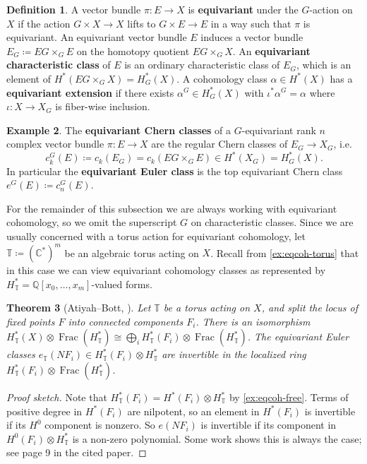 \documentclass{report}
\theoremstyle{plain}
\newtheorem{theorem}{Theorem}[section]
\theoremstyle{definition}
\newtheorem{definition}[theorem]{Definition}
\newtheorem{example}[theorem]{Example}
\theoremstyle{remark}
\newcommand{\bC}{\mathbb{C}}
\newcommand{\bT}{\mathbb{T}}
\newcommand{\bQ}{\mathbb{Q}}
\DeclareMathOperator{\Frac}{Frac}
\begin{document}
\begin{definition} \label{def:equivariant-characteristic-classes}
  A vector bundle $\pi\colon E \to X$ is {\bf equivariant} under the
  $G$-action on $X$ if the action $G \times X \to X$ lifts to $G
  \times E \to E$ in a way such that $\pi$ is equivariant. An
  equivariant vector bundle $E$ induces a vector bundle $E_G \coloneqq
  EG \times_G E$ on the homotopy quotient $EG \times_G X$. An {\bf
    equivariant characteristic class} of $E$ is an ordinary
  characteristic class of $E_G$, which is an element of $H^*(EG
  \times_G X) = H^*_G(X)$. A cohomology class $\alpha \in H^*(X)$ has
  a {\bf equivariant extension} if there exists $\alpha^G \in
  H^*_G(X)$ with $\iota^*\alpha^G = \alpha$ where $\iota\colon X \to
  X_G$ is fiber-wise inclusion.
\end{definition}

\begin{example}
  The {\bf equivariant Chern classes} of a $G$-equivariant rank $n$
  complex vector bundle $\pi\colon E \to X$ are the regular Chern
  classes of $E_G \to X_G$, i.e.
  \[ c_k^G(E) \coloneqq c_k(E_G) = c_k(EG \times_G E) \in H^*(X_G) = H^*_G(X). \]
  In particular the {\bf equivariant Euler class} is the top
  equivariant Chern class $e^G(E) \coloneqq c_n^G(E)$.
\end{example}

For the remainder of this subsection we are always working with
equivariant cohomology, so we omit the superscript $G$ on
characteristic classes. Since we are usually concerned with a torus
action for equivariant cohomology, let $\bT \coloneqq (\bC^*)^m$ be an
algebraic torus acting on $X$. Recall from \ref{ex:eqcoh-torus} that
in this case we can view equivariant cohomology classes as represented
by $H^*_{\bT} = \bQ[x_0, \ldots, x_m]$-valued forms.

\begin{theorem}[Atiyah--Bott, \cite{Atiyah1984}] \label{thm:atiyah-bott-localization}
  Let $\bT$ be a torus acting on $X$, and split the locus of fixed
  points $F$ into connected components $F_i$. There is an isomorphism
  $H^*_{\bT}(X) \otimes \Frac(H^*_{\bT}) \cong \bigoplus_i
  H^*_{\bT}(F_i) \otimes \Frac(H^*_{\bT})$. The equivariant Euler
  classes $e_{\bT}(NF_i) \in H^*_{\bT}(F_i) \otimes H^*_{\bT}$ are
  invertible in the localized ring $H^*_{\bT}(F_i) \otimes
  \Frac(H^*_{\bT})$.
\end{theorem}

\begin{proof}[Proof sketch]
  Note that $H^*_{\bT}(F_i) = H^*(F_i) \otimes H^*_{\bT}$ by
  \ref{ex:eqcoh-free}. Terms of positive degree in $H^*(F_i)$ are
  nilpotent, so an element in $H^*(F_i)$ is invertible if its $H^0$
  component is nonzero. So $e(NF_i)$ is invertible if its component in
  $H^0(F_i) \otimes H^*_{\bT}$ is a non-zero polynomial. Some work
  shows this is always the case; see page 9 in the cited paper.
\end{proof}
\end{document}
